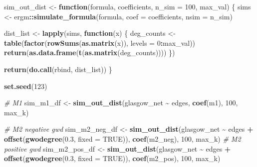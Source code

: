 \documentclass[
]{article}
\newenvironment{Shaded}{\begin{snugshade}}{\end{snugshade}}
\newcommand{\AttributeTok}[1]{\textcolor[rgb]{0.13,0.29,0.53}{#1}}
\newcommand{\CommentTok}[1]{\textcolor[rgb]{0.56,0.35,0.01}{\textit{#1}}}
\newcommand{\ConstantTok}[1]{\textcolor[rgb]{0.56,0.35,0.01}{#1}}
\newcommand{\ControlFlowTok}[1]{\textcolor[rgb]{0.13,0.29,0.53}{\textbf{#1}}}
\newcommand{\DecValTok}[1]{\textcolor[rgb]{0.00,0.00,0.81}{#1}}
\newcommand{\FloatTok}[1]{\textcolor[rgb]{0.00,0.00,0.81}{#1}}
\newcommand{\FunctionTok}[1]{\textcolor[rgb]{0.13,0.29,0.53}{\textbf{#1}}}
\newcommand{\NormalTok}[1]{#1}
\newcommand{\OtherTok}[1]{\textcolor[rgb]{0.56,0.35,0.01}{#1}}
\newcommand{\SpecialCharTok}[1]{\textcolor[rgb]{0.81,0.36,0.00}{\textbf{#1}}}
\begin{document}
\begin{Shaded}
\begin{Highlighting}[]
\NormalTok{sim\_out\_dist }\OtherTok{\textless{}{-}} \ControlFlowTok{function}\NormalTok{(formula, coefficients, }\AttributeTok{n\_sim =} \DecValTok{100}\NormalTok{, max\_val) \{}
\NormalTok{  sims }\OtherTok{\textless{}{-}}\NormalTok{ ergm}\SpecialCharTok{::}\FunctionTok{simulate\_formula}\NormalTok{(formula, }\AttributeTok{coef =}\NormalTok{ coefficients, }\AttributeTok{nsim =}\NormalTok{ n\_sim)}
  
\NormalTok{  dist\_list }\OtherTok{\textless{}{-}} \FunctionTok{lapply}\NormalTok{(sims, }\ControlFlowTok{function}\NormalTok{(x) \{}
\NormalTok{    deg\_counts }\OtherTok{\textless{}{-}} \FunctionTok{table}\NormalTok{(}\FunctionTok{factor}\NormalTok{(}\FunctionTok{rowSums}\NormalTok{(}\FunctionTok{as.matrix}\NormalTok{(x)), }\AttributeTok{levels =} \DecValTok{0}\SpecialCharTok{:}\NormalTok{max\_val))}
    \FunctionTok{return}\NormalTok{(}\FunctionTok{as.data.frame}\NormalTok{(}\FunctionTok{t}\NormalTok{(}\FunctionTok{as.matrix}\NormalTok{(deg\_counts))))}
\NormalTok{  \})}
  
  \FunctionTok{return}\NormalTok{(}\FunctionTok{do.call}\NormalTok{(rbind, dist\_list))}
\NormalTok{\}}

\FunctionTok{set.seed}\NormalTok{(}\DecValTok{123}\NormalTok{)}

\CommentTok{\# M1}
\NormalTok{sim\_m1\_df }\OtherTok{\textless{}{-}} \FunctionTok{sim\_out\_dist}\NormalTok{(glasgow\_net }\SpecialCharTok{\textasciitilde{}}\NormalTok{ edges, }
                          \FunctionTok{coef}\NormalTok{(m1), }\DecValTok{100}\NormalTok{, max\_k)}

\CommentTok{\# M2 negative gwd}
\NormalTok{sim\_m2\_neg\_df }\OtherTok{\textless{}{-}} \FunctionTok{sim\_out\_dist}\NormalTok{(glasgow\_net }\SpecialCharTok{\textasciitilde{}}\NormalTok{ edges }\SpecialCharTok{+} \FunctionTok{offset}\NormalTok{(}\FunctionTok{gwodegree}\NormalTok{(}\FloatTok{0.3}\NormalTok{, }\AttributeTok{fixed =} \ConstantTok{TRUE}\NormalTok{)), }
                              \FunctionTok{coef}\NormalTok{(m2\_neg), }\DecValTok{100}\NormalTok{, max\_k)}
\CommentTok{\# M2 positive gwd}
\NormalTok{sim\_m2\_pos\_df }\OtherTok{\textless{}{-}} \FunctionTok{sim\_out\_dist}\NormalTok{(glasgow\_net }\SpecialCharTok{\textasciitilde{}}\NormalTok{ edges }\SpecialCharTok{+} \FunctionTok{offset}\NormalTok{(}\FunctionTok{gwodegree}\NormalTok{(}\FloatTok{0.3}\NormalTok{, }\AttributeTok{fixed =} \ConstantTok{TRUE}\NormalTok{)), }
                              \FunctionTok{coef}\NormalTok{(m2\_pos), }\DecValTok{100}\NormalTok{, max\_k)}


\end{Highlighting}
\end{Shaded}
\end{document}
